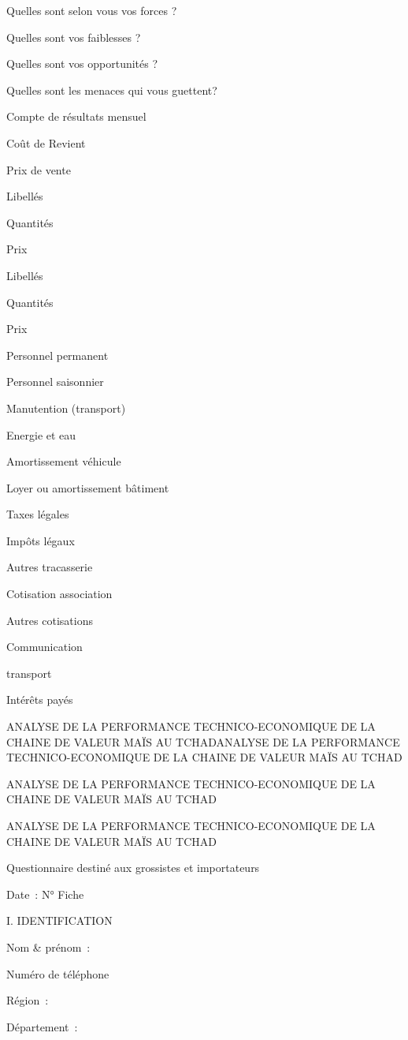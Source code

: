 \documentclass[12pt,oneside]{report}
\begin{document}
Quelles sont selon vous vos forces ?

Quelles sont vos faiblesses ?

Quelles sont vos opportunités ?

Quelles sont les menaces qui vous guettent?

Compte de résultats mensuel

Coût de Revient

Prix de vente

Libellés

Quantités

Prix

Libellés

Quantités

Prix

Personnel permanent

Personnel saisonnier

Manutention (transport)

Energie et eau

Amortissement véhicule

Loyer ou amortissement bâtiment

Taxes légales

Impôts légaux

Autres tracasserie

Cotisation association

Autres cotisations

Communication

transport

Intérêts payés

ANALYSE DE LA PERFORMANCE TECHNICO-ECONOMIQUE DE LA CHAINE DE VALEUR  MAÏS AU TCHADANALYSE DE LA PERFORMANCE TECHNICO-ECONOMIQUE DE LA CHAINE DE VALEUR  MAÏS AU TCHAD

ANALYSE DE LA PERFORMANCE TECHNICO-ECONOMIQUE DE LA CHAINE DE VALEUR  MAÏS AU TCHAD

ANALYSE DE LA PERFORMANCE TECHNICO-ECONOMIQUE DE LA CHAINE DE VALEUR  MAÏS AU TCHAD

Questionnaire destiné aux grossistes et importateurs

Date :                                                                                           N° Fiche

I. IDENTIFICATION

Nom \& prénom :

Numéro de téléphone

Région :

Département :
\end{document}
